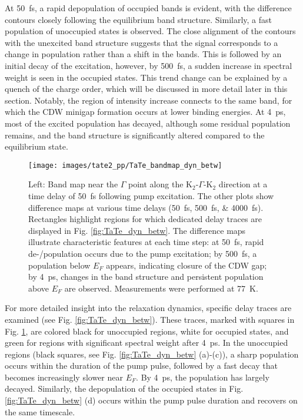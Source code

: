 At \qty{50}{\femto\second}, a rapid depopulation of occupied bands is evident, with the difference contours closely following the equilibrium band structure.
Similarly, a fast population of unoccupied states is observed.
The close alignment of the contours with the unexcited band structure suggests that the signal corresponds to a change in population rather than a shift in the bands.
This is followed by an initial decay of the excitation, however, by \qty{500}{\femto\second}, a sudden increase in spectral weight is seen in the occupied states.
This trend change can be explained by a quench of the charge order, which will be discussed in more detail later in this section.
Notably, the region of intensity increase connects to the same band, for which the CDW minigap formation occurs at lower binding energies.
At \qty{4}{\pico\second}, most of the excited population has decayed, although some residual population remains, and the band structure is significantly altered compared to the equilibrium state.

\begin{figure}[t!]
	\centering
	\texttt{[image: images/tate2\_pp/TaTe\_bandmap\_dyn\_betw]}
	\caption{Left: Band map near the $\Gamma$ point along the K$_2$-$\Gamma$-K$_2$ direction at a time delay of \qty{50}{\femto\second} following pump excitation. The other plots show difference maps at various time delays (\qtylist{50;500;4000}{\femto\second}). Rectangles highlight regions for which dedicated delay traces are displayed in Fig. \ref{fig:TaTe_dyn_betw}. The difference maps illustrate characteristic features at each time step: at \qty{50}{\femto\second}, rapid de-/population occurs due to the pump excitation; by \qty{500}{\femto\second}, a population below $E_F$ appears, indicating closure of the CDW gap; by \qty{4}{\pico\second}, changes in the band structure and persistent population above $E_F$ are observed. Measurements were performed at \qty{77}{\kelvin}.}
	\label{fig:TaTe_bandmap_dyn_betw}
\end{figure}

For more detailed insight into the relaxation dynamics, specific delay traces are examined (see Fig. \ref{fig:TaTe_dyn_betw}).
These traces, marked with squares in Fig. \ref{fig:TaTe_bandmap_dyn_betw}, are colored black for unoccupied regions, white for occupied states, and green for regions with significant spectral weight after \qty{4}{\pico\second}.
In the unoccupied regions (black squares, see Fig. \ref{fig:TaTe_dyn_betw} (a)-(c)), a sharp population occurs within the duration of the pump pulse, followed by a fast decay that becomes increasingly slower near $E_F$.
By \qty{4}{\pico\second}, the population has largely decayed.
Similarly, the depopulation of the occupied states in Fig. \ref{fig:TaTe_dyn_betw} (d) occurs within the pump pulse duration and recovers on the same timescale.

